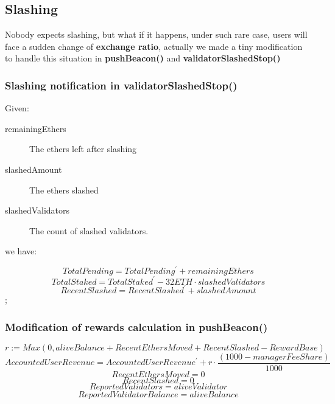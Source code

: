 \documentclass{article}
\begin{document}
\subsection{Slashing}
Nobody expects slashing, but what if it happens, under such rare case, users will face a sudden change of \textbf{exchange ratio}, actually we made a tiny modification to handle this situation in \textbf{pushBeacon()} and \textbf{validatorSlashedStop()}

\subsubsection{Slashing notification in validatorSlashedStop()}
Given:
\begin{description}
\item[remainingEthers] The ethers left after slashing
\item[slashedAmount] The ethers slashed
\item[slashedValidators] The count of slashed validators.
\end{description}
we have:
\begin{theorem}
\[TotalPending = TotalPending^{\prime} + remainingEthers \]
\[TotalStaked = TotalStaked^{\prime} - 32 ETH \cdot slashedValidators \]
\[RecentSlashed = RecentSlashed^{\prime} +  slashedAmount \];
\end{theorem}

\subsubsection{Modification of rewards calculation in pushBeacon()}
\begin{theorem}
\[r := Max(0, aliveBalance + RecentEthersMoved + RecentSlashed - RewardBase)\]
\[AccountedUserRevenue = AccountedUserRevenue^{\prime} + r \cdot \frac{(1000 - managerFeeShare)}{1000}\]
\[RecentEthersMoved = 0\]
\[RecentSlashed = 0\]
\[ReportedValidators = aliveValidator\]
\[ReportedValidatorBalance = aliveBalance\]
\end{theorem}
\end{document}
